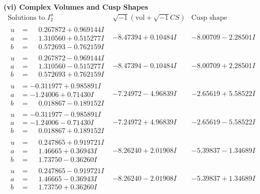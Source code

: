 \documentclass[1p]{elsarticle_modified}
\theoremstyle{definition}
\newcommand{\I}{\sqrt{-1}}
\begin{document}
\newpage\flushleft \textbf{(vi) Complex Volumes and Cusp Shapes}
$$\begin{array}{c|c|c}  
\text{Solutions to }I^u_{2}& \I (\text{vol} + \sqrt{-1}CS) & \text{Cusp shape}\\
 \hline 
\begin{aligned}
u &= \phantom{-}0.267872 + 0.969144 I \\
a &= \phantom{-}1.310560 + 0.515277 I \\
b &= \phantom{-}0.572693 - 0.762159 I\end{aligned}
 & -8.47394 + 0.10484 I & -8.00709 - 2.28501 I \\ \hline\begin{aligned}
u &= \phantom{-}0.267872 - 0.969144 I \\
a &= \phantom{-}1.310560 - 0.515277 I \\
b &= \phantom{-}0.572693 + 0.762159 I\end{aligned}
 & -8.47394 - 0.10484 I & -8.00709 + 2.28501 I \\ \hline\begin{aligned}
u &= -0.311977 + 0.985891 I \\
a &= -1.24006 + 0.71430 I \\
b &= \phantom{-}0.018867 - 0.189152 I\end{aligned}
 & -7.24972 - 4.96839 I & -2.65619 + 5.58522 I \\ \hline\begin{aligned}
u &= -0.311977 - 0.985891 I \\
a &= -1.24006 - 0.71430 I \\
b &= \phantom{-}0.018867 + 0.189152 I\end{aligned}
 & -7.24972 + 4.96839 I & -2.65619 - 5.58522 I \\ \hline\begin{aligned}
u &= \phantom{-}0.247865 + 0.919721 I \\
a &= \phantom{-}1.46665 + 0.36943 I \\
b &= \phantom{-}1.73750 - 0.36260 I\end{aligned}
 & -8.26240 + 2.01908 I & -5.39837 - 1.34689 I \\ \hline\begin{aligned}
u &= \phantom{-}0.247865 - 0.919721 I \\
a &= \phantom{-}1.46665 - 0.36943 I \\
b &= \phantom{-}1.73750 + 0.36260 I\end{aligned}
 & -8.26240 - 2.01908 I & -5.39837 + 1.34689 I \\ \hline\begin{aligned}

\end{aligned}
\end{array}$$
\end{document}
